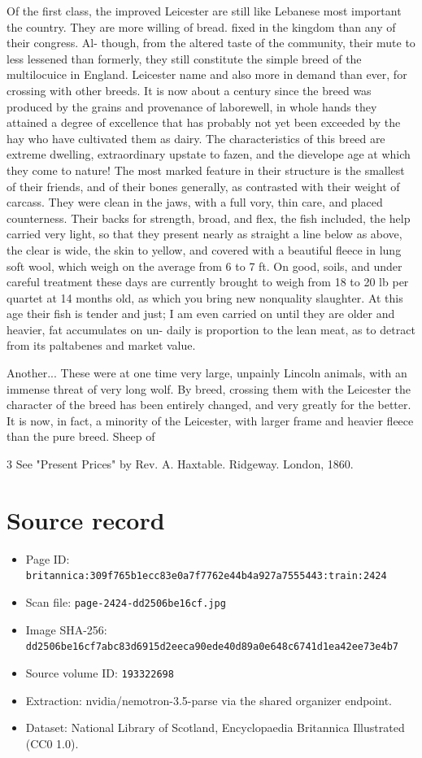 \documentclass{article}
\begin{document}
Of the first class, the improved Leicester are still like Lebanese most important the country. They are more willing of bread. fixed in the kingdom than any of their congress. Al- though, from the altered taste of the community, their mute to less lessened than formerly, they still constitute the simple breed of the multilocuice in England. Leicester name and also more in demand than ever, for crossing with other breeds. It is now about a century since the breed was produced by the grains and provenance of laborewell, in whole hands they attained a degree of excellence that has probably not yet been exceeded by the hay who have cultivated them as dairy. The characteristics of this breed are extreme dwelling, extraordinary upstate to fazen, and the dievelope age at which they come to nature! The most marked feature in their structure is the smallest of their friends, and of their bones generally, as contrasted with their weight of carcass. They were clean in the jaws, with a full vory, thin care, and placed counterness. Their backs for strength, broad, and flex, the fish included, the help carried very light, so that they present nearly as straight a line below as above, the clear is wide, the skin to yellow, and covered with a beautiful fleece in lung soft wool, which weigh on the average from 6 to 7 ft. On good, soils, and under careful treatment these days are currently brought to weigh from 18 to 20 lb per quartet at 14 months old, as which you bring new nonquality slaughter. At this age their fish is tender and just; I am even carried on until they are older and heavier, fat accumulates on un- daily is proportion to the lean meat, as to detract from its paltabenes and market value.

Another... These were at one time very large, unpainly Lincoln animals, with an immense threat of very long wolf. By breed, crossing them with the Leicester the character of the breed has been entirely changed, and very greatly for the better. It is now, in fact, a minority of the Leicester, with larger frame and heavier fleece than the pure breed. Sheep of

3 See "Present Prices" by Rev. A. Haxtable. Ridgeway. London, 1860.

\section*{Source record}
\begin{itemize}
\item Page ID: \texttt{britannica:309f765b1ecc83e0a7f7762e44b4a927a7555443:train:2424}
\item Scan file: \texttt{page-2424-dd2506be16cf.jpg}
\item Image SHA-256: \texttt{dd2506be16cf7abc83d6915d2eeca90ede40d89a0e648c6741d1ea42ee73e4b7}
\item Source volume ID: \texttt{193322698}
\item Extraction: nvidia/nemotron-3.5-parse via the shared organizer endpoint.
\item Dataset: National Library of Scotland, Encyclopaedia Britannica Illustrated (CC0 1.0).
\end{itemize}
\end{document}
